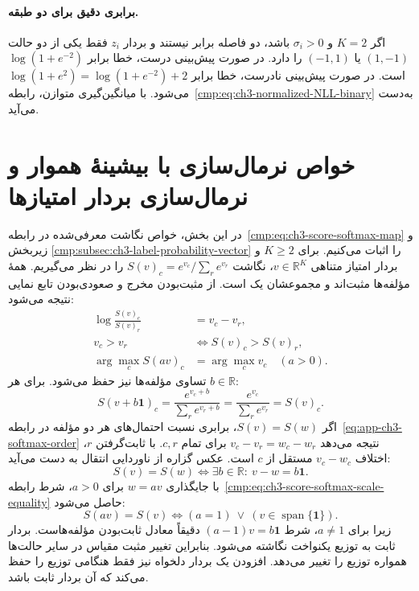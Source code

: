\paragraph{برابری دقیق برای دو طبقه.}
اگر $K=2$ و $\sigma_i>0$ باشد، دو فاصله برابر نیستند و بردار $z_i$ فقط یکی از دو حالت $(1,-1)$ یا $(-1,1)$ را دارد. در صورت پیش‌بینی درست، خطا برابر $\log(1+e^{-2})$ است. در صورت پیش‌بینی نادرست، خطا برابر
$\log(1+e^{2})=\log(1+e^{-2})+2$ می‌شود. با میانگین‌گیری متوازن، رابطه~\eqref{cmp:eq:ch3-normalized-NLL-binary} به‌دست می‌آید.



\section{خواص نرمال‌سازی با بیشینهٔ هموار و نرمال‌سازی بردار امتیازها}
\label{app:ch3-softmax-properties}
در این بخش، خواص نگاشت معرفی‌شده در
رابطه~\eqref{cmp:eq:ch3-score-softmax-map} و زیربخش
\ref{cmp:subsec:ch3-label-probability-vector} را اثبات می‌کنیم.
برای $K\ge2$ و بردار امتیاز متناهی $v\in\mathbb R^K$،
نگاشت $S(v)_c=e^{v_c}/\sum_re^{v_r}$ را در نظر می‌گیریم.
همهٔ مؤلفه‌ها مثبت‌اند و مجموعشان یک است. از مثبت‌بودن
مخرج و صعودی‌بودن تابع نمایی نتیجه می‌شود:
\begin{equation}\label{eq:app-ch3-softmax-order}
\begin{aligned}
\log\frac{S(v)_c}{S(v)_r}&=v_c-v_r,\\
v_c>v_r&\iff S(v)_c>S(v)_r,\\
\arg\max_c S(av)_c&=\arg\max_c v_c\quad(a>0).
\end{aligned}
\end{equation}
تساوی مؤلفه‌ها نیز حفظ می‌شود. برای هر $b\in\mathbb R$:
\begin{equation}\label{eq:app-ch3-softmax-translation}
S(v+b\mathbf1)_c
=\frac{e^{v_c+b}}{\sum_re^{v_r+b}}
=\frac{e^{v_c}}{\sum_re^{v_r}}=S(v)_c.
\end{equation}
اگر $S(v)=S(w)$، برابری نسبت احتمال‌های هر دو مؤلفه
در رابطه~\eqref{eq:app-ch3-softmax-order} نتیجه می‌دهد
$v_c-v_r=w_c-w_r$ برای تمام $c,r$. با ثابت‌گرفتن
$r$، اختلاف $v_c-w_c$ مستقل از $c$ است. عکس گزاره
از ناوردایی انتقال به دست می‌آید:
\begin{equation}\label{eq:app-ch3-softmax-equality}
S(v)=S(w)\iff\exists b\in\mathbb R:\ v-w=b\mathbf1.
\end{equation}
با جایگذاری $w=av$ برای $a>0$، شرط رابطه~\eqref{cmp:eq:ch3-score-softmax-scale-equality} حاصل می‌شود:
\begin{equation}\label{eq:app-ch3-softmax-scale-equality}
S(av)=S(v)\iff (a=1)\ \lor\
(v\in\operatorname{span}\{\mathbf1\}).
\end{equation}
زیرا برای $a\ne1$، شرط $(a-1)v=b\mathbf1$ دقیقاً
معادل ثابت‌بودن مؤلفه‌هاست. بردار ثابت به توزیع
یکنواخت نگاشته می‌شود. بنابراین تغییر مثبت مقیاس
در سایر حالت‌ها همواره توزیع را تغییر می‌دهد.
افزودن یک بردار دلخواه نیز فقط هنگامی توزیع را
حفظ می‌کند که آن بردار ثابت باشد.


